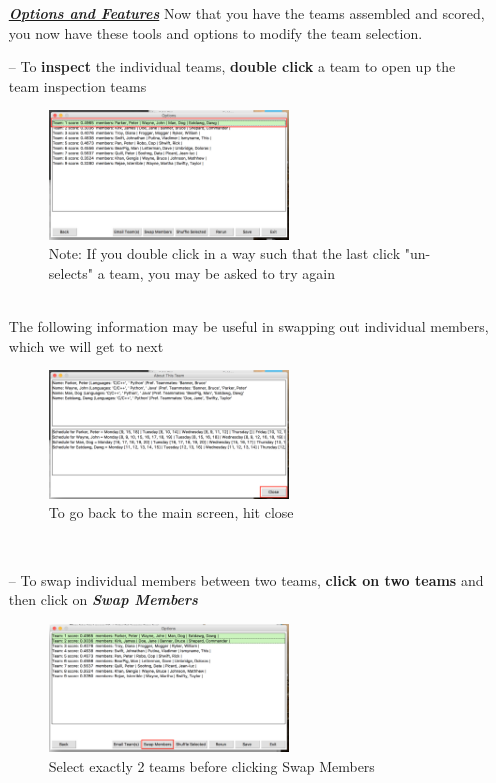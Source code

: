 \documentclass[10pt]{article}
\begin{document}
\begin{enumerate}
\LARGE
\textbf{\textit{\underline{Options and Features}}}
\normalsize
\newline
\newline
Now that you have the teams assembled and scored, you now have these tools and options to modify the team selection.
\item[--] To \textbf{inspect} the individual teams, \textbf{double click} a team to open up the team inspection teams
\begin{figure}[h]
\caption{Note: If you double click in a way such that the last click "un-selects" a team, \newline you may be asked to try again}
\centering
\includegraphics[width=0.6\textwidth]{pic14}
\end{figure}\\
\newpage
The following information may be useful in swapping out individual members, which we will get to next
\begin{figure}[h]
\caption{To go back to the main screen, hit close}
\centering
\includegraphics[width=0.6\textwidth]{pic15}
\end{figure}\\
\item[--] To swap individual members between two teams, \textbf{click on two teams} and then click on \textbf{\textit{Swap Members}}
\begin{figure}[h]
\caption{Select exactly 2 teams before clicking Swap Members}
\centering
\includegraphics[width=0.6\textwidth]{pic16}

\end{figure}
\end{enumerate}
\end{document}
